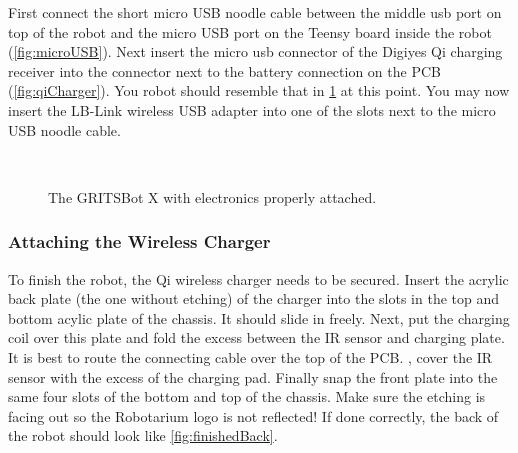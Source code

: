 First connect the short micro USB noodle cable between the middle usb port on top of the robot and the micro USB port on the Teensy board inside the robot (\cref{fig:microUSB}). Next insert the micro usb connector of the Digiyes Qi charging receiver into the connector next to the battery connection on the PCB (\cref{fig:qiCharger}). You robot should resemble that in \cref{fig:attachedElectronics} at this point. You may now insert the LB-Link wireless USB adapter into one of the slots next to the micro USB noodle cable.

\begin{figure}[h!]
\centering
{}
\hfill
{}\\
\caption{The GRITSBot X with electronics properly attached.}
\label{fig:attachedElectronics}
\end{figure}

\subsubsection{Attaching the Wireless Charger}
\label{sec:chargingPlate}

To finish the robot, the Qi wireless charger needs to be secured. Insert the acrylic back plate (the one without etching) of the charger into the slots in the top and bottom acylic plate of the chassis. It should slide in freely. Next, put the charging coil over this plate and fold the excess between the IR sensor and charging plate. It is best to route the connecting cable over the top of the PCB. {\color{red}{Do not}}, cover the IR sensor with the excess of the charging pad. Finally snap the front plate into the same four slots of the bottom and top of the chassis. Make sure the etching is facing out so the Robotarium logo is not reflected! If done correctly, the back of the robot should look like \cref{fig:finishedBack}.

